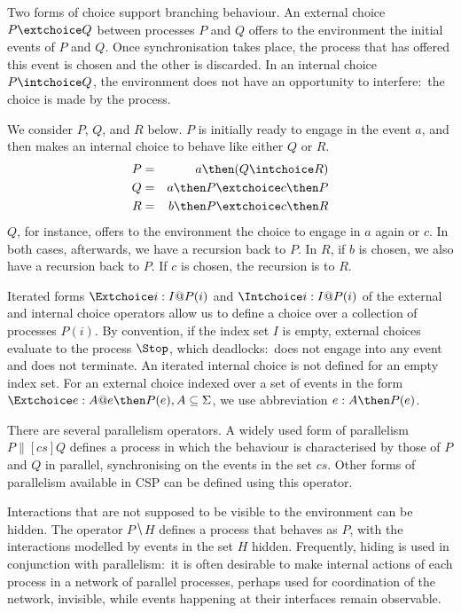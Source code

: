 Two forms of choice support branching behaviour. An external choice $P
\extchoice Q$ between processes $P$ and $Q$ offers to the environment the
initial events of $P$ and $Q$. Once synchronisation takes place, the process
that has offered this event is chosen and the other is discarded. In an
internal choice $P \intchoice Q$, the environment does not have an
opportunity to interfere:~the choice is made by the process.
%
\begin{example}\label{example:CSP}
  We consider $P$, $Q$, and $R$ below. $P$ is initially
  ready to engage in the event $a$, and then makes an internal  choice to
  behave like either $Q$ or $R$.
  \begin{eqnarray*}
  P & = & a \then (Q\intchoice R)
  \\
  Q & = & a \then P \extchoice c \then P
  \\
  R & = & b \then P \extchoice c \then R
  \end{eqnarray*}
  $Q$, for instance, offers to the environment the choice to engage in $a$
  again or $c$. In both cases, afterwards, we have a recursion back to $P$.
  In $R$, if $b$ is chosen, we also have a recursion back to $P$. If $c$ is
  chosen, the recursion is to $R$.
  \xbox
\end{example}
%
Iterated forms $\Extchoice i: I @ P(i)$ and $\Intchoice i: I @ P(i)$ of the
external and internal choice operators allow us to define a choice over a
collection of processes $P(i)$. By convention,  if the index set $I$ is
empty, external choices evaluate to the process $\Stop$, which
deadlocks:~does not engage into any event and does not terminate. An iterated
internal choice is not defined for an empty index set. For an external choice 
indexed over a set of events in the form
$\Extchoice e: A @ e \then P(e), A\subseteq \Sigma$, we use 
abbreviation $e:A \then P(e)$.

There are several parallelism operators. A widely used form of parallelism $P
\parallel[cs] Q$ defines a process in which the behaviour is characterised by
those of $P$ and $Q$ in parallel, synchronising on the events in the set
$cs$. Other forms of parallelism available in CSP can be defined using this
operator.

Interactions that are not supposed to be visible to the environment can be
hidden. The operator $P \hide H$ defines a process that behaves as $P$, with
the interactions modelled by events in the set $H$ hidden. Frequently, hiding
is used in conjunction with parallelism:~it is often desirable to make
internal actions of each process in a network of parallel processes, perhaps
used for coordination of the network, invisible, while events happening at
their interfaces remain observable.

